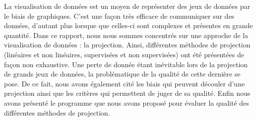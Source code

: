 
La visualisation de données est un moyen de représenter des jeux de données par le biais de graphiques.
C'est une façon très efficace de communiquer sur des données, d'autant plus lorsque que celles-ci sont complexes et présentes en grande quantité.
Dans ce rapport, nous nous sommes concentrés sur une approche de la visualisation de données : la projection. 
Ainsi, différentes méthodes de projection (linéaires et non linéaires, supervisées et non supervisées) ont été présentées de façon non exhaustive. 
Une perte de donnée étant inévitable lors de la projection de grands jeux de données, la problématique de la qualité de cette dernière se pose. 
De ce fait, nous avons également cité les biais qui peuvent découler d'une projection ainsi que les critères qui permettent de juger de sa qualité.
Enfin nous avons présenté le programme que nous avons proposé pour évaluer la qualité des différentes méthodes de projection.

